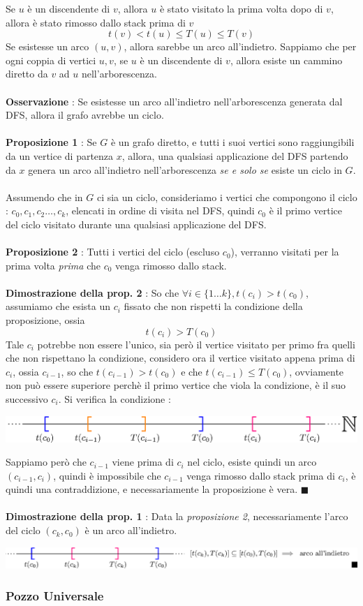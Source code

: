 \documentclass[12pt, letterpaper]{article}
\newcommand{\acc}{\\\hphantom{}\\}
\begin{document}
Se \(u\) è un discendente di \(v\), allora \(u\) è stato visitato la prima volta dopo di \(v\), allora è stato
rimosso dallo stack prima di \(v\) $$t(v)<t(u)\le T(u)\le T(v)$$
Se esistesse un arco $(u,v)$, allora sarebbe un arco all'indietro. Sappiamo che per ogni coppia di vertici
\(u,v\), se \(u\) è un discendente di \(v\), allora esiste un cammino diretto da \(v\) ad \(u\) nell'arborescenza.\acc
\textbf{Osservazione} : Se esistesse un arco all'indietro nell'arborescenza generata dal DFS, allora
il grafo avrebbe un ciclo.\acc
\textbf{Proposizione 1} : Se \(G\) è un grafo diretto, e tutti i suoi vertici sono raggiungibili da un
vertice di partenza \(x\), allora, una qualsiasi applicazione del DFS partendo da \(x\) genera un
arco all'indietro nell'arborescenza \textit{se e solo se} esiste un ciclo in \(G\).\acc
Assumendo che in \(G\) ci sia un ciclo, consideriamo i vertici che compongono il ciclo :
$c_0,c_1,c_2\dots,c_k$, elencati in ordine di visita nel DFS, quindi \(c_0\) è il primo vertice del ciclo
visitato durante una qualsiasi applicazione del DFS.
\acc\textbf{Proposizione 2} : Tutti i vertici del ciclo (escluso $c_0$), verranno visitati per la prima
volta \textit{prima} che \(c_0\) venga rimosso dallo stack.\acc
\textbf{Dimostrazione della prop. 2} : So che $\forall i\in\{1\dots k\},t(c_i)>t(c_0)$, assumiamo che
esista un \(c_i\) fissato che non rispetti la condizione della proposizione, ossia $$t(c_i)>T(c_0)$$
Tale $c_i$ potrebbe non essere l'unico, sia però il vertice visitato per primo fra quelli che non rispettano
la condizione, considero ora il vertice visitato appena prima di $c_i$, ossia $c_{i-1}$, so che
$t(c_{i-1})>t(c_0)$ e che $t(c_{i-1})\le T(c_0)$, ovviamente non può essere superiore perchè il primo
vertice che viola la condizione, è il suo successivo $c_i$. Si verifica la condizione :
\begin{center}
    \includegraphics[width=1\textwidth ]{images/realLine.eps}
\end{center}
Sappiamo però che $c_{i-1}$ viene prima di $c_i$ nel ciclo, esiste quindi un arco $(c_{i-1},c_i)$, quindi
è impossibile che $c_{i-1}$ venga rimosso dallo stack prima di $c_i$, è quindi una contraddizione, e
necessariamente la proposizione è vera. \(\blacksquare\)\acc
\textbf{Dimostrazione della prop. 1} : Data la \textit{proposizione 2}, necessariamente l'arco del
ciclo \((c_k,c_0)\) è un arco all'indietro. \begin{center}
    \includegraphics[width=1\textwidth ]{images/realLine2.eps}
\end{center}\subsubsection{Pozzo Universale}
\end{document}
